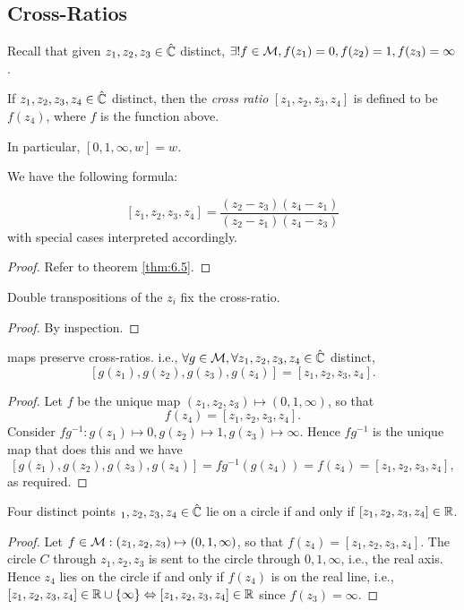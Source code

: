 \documentclass[10pt]{article}
\begin{document}
    \subsection{Cross-Ratios}
    Recall that given $z_1,z_2,z_3 \in \hat{{\mathbb{C}}}$ distinct, $ \exists !f\in {\mathcal{M}}, f(z_1)=0, f(z_2)=1,f(z_3)=\infty  $. 
    \begin{definition}
        If $z_1,z_2,z_3,z_4 \in \hat{{\mathbb{C}}}$ distinct, then the \textit{cross ratio} $ [z_1,z_2,z_3,z_4] $ is defined to be $f(z_4)$, where $f$ is the function above.

        In particular, $ [0,1,\infty,w]=w $.
    \end{definition}
    We have the following formula:
    \begin{proposition}
        \[
            [z_1,z_2,z_3,z_4] = \frac{(z_2-z_3)(z_4-z_1)}{(z_2-z_1)(z_4-z_3)}
        \]
        with special cases interpreted accordingly.
    \end{proposition}
    \begin{proof}
        Refer to theorem \ref{thm:6.5}.
    \end{proof}
    \begin{proposition}\label{prop:6.10}
        Double transpositions of the $z_i$ fix the cross-ratio.
    \end{proposition}
    \begin{proof}
        By inspection.
    \end{proof}
    \begin{theorem}\label{thm:6.11}
        \mobius maps preserve cross-ratios. i.e., $ \forall g\in {\mathcal{M}}, \forall z_1,z_2,z_3,z_4\in \hat{{\mathbb{C}}} $ distinct,
        \[
            [g(z_1),g(z_2),g(z_3),g(z_4)]=[z_1,z_2,z_3,z_4].
        \] 
    \end{theorem}
    \begin{proof}
        Let $f$ be the unique \mobius map $ (z_1,z_2,z_3)\mapsto (0,1,\infty ) $, so that 
        \[
            f(z_4)=[z_1,z_2,z_3,z_4].
        \]
        Consider $ fg^{-1}: g(z_1)\mapsto 0,g(z_2)\mapsto 1,g(z_3)\mapsto \infty  $. Hence $fg^{-1}$ is the unique map that does this and we have 
        \[
            [g(z_1),g(z_2),g(z_3),g(z_4)] = fg^{-1}(g(z_4))=f(z_4)=[z_1,z_2,z_3,z_4],
        \]
        as required.
    \end{proof}
    \begin{corollary}\label{col:6.12}
        Four distinct points $_1,z_2,z_3,z_4\in \hat{{\mathbb{C}}}$ lie on a circle if and only if $[z_1,z_2,z_3,z_4]\in {\mathbb{R}}$.
    \end{corollary}
    \begin{proof}
        Let $f\in {\mathcal{M}}: (z_1,z_2,z_3)\mapsto (0,1,\infty )$, so that $ f(z_4)=[z_1,z_2,z_3,z_4] $. The circle $C$ through $z_1,z_2,z_3$ is sent to the circle through $0,1,\infty$, i.e., the real axis. Hence $z_4$ lies on the circle if and only if $f(z_4)$ is on the real line, i.e., $[z_1,z_2,z_3,z_4]\in {\mathbb{R}} \cup \{\infty\} \Leftrightarrow [z_1,z_2,z_3,z_4]\in {\mathbb{R}}$ since $f(z_3)=\infty$.
    \end{proof}
\end{document}
